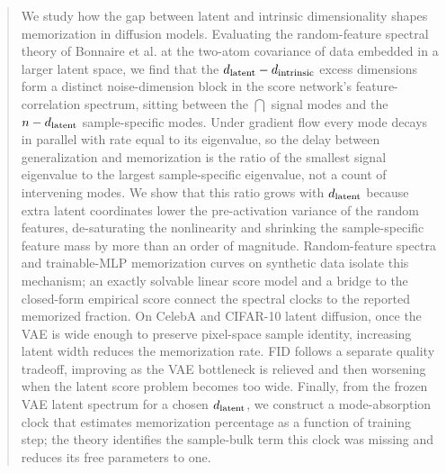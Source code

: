 \begin{abstract}%
We study how the gap between latent and intrinsic dimensionality shapes memorization in diffusion models. Evaluating the random-feature spectral theory of Bonnaire et al. at the two-atom covariance of data embedded in a larger latent space, we find that the $\dlat-\dint$ excess dimensions form a distinct noise-dimension block in the score network's feature-correlation spectrum, sitting between the $\dint$ signal modes and the $\nsamp-\dlat$ sample-specific modes. Under gradient flow every mode decays in parallel with rate equal to its eigenvalue, so the delay between generalization and memorization is the ratio of the smallest signal eigenvalue to the largest sample-specific eigenvalue, not a count of intervening modes. We show that this ratio grows with $\dlat$ because extra latent coordinates lower the pre-activation variance of the random features, de-saturating the nonlinearity and shrinking the sample-specific feature mass by more than an order of magnitude. Random-feature spectra and trainable-MLP memorization curves on synthetic data isolate this mechanism; an exactly solvable linear score model and a bridge to the closed-form empirical score connect the spectral clocks to the reported memorized fraction. On CelebA and CIFAR-10 latent diffusion, once the VAE is wide enough to preserve pixel-space sample identity, increasing latent width reduces the memorization rate. FID follows a separate quality tradeoff, improving as the VAE bottleneck is relieved and then worsening when the latent score problem becomes too wide. Finally, from the frozen VAE latent spectrum for a chosen $\dlat$, we construct a mode-absorption clock that estimates memorization percentage as a function of training step; the theory identifies the sample-bulk term this clock was missing and reduces its free parameters to one.
\end{abstract}
